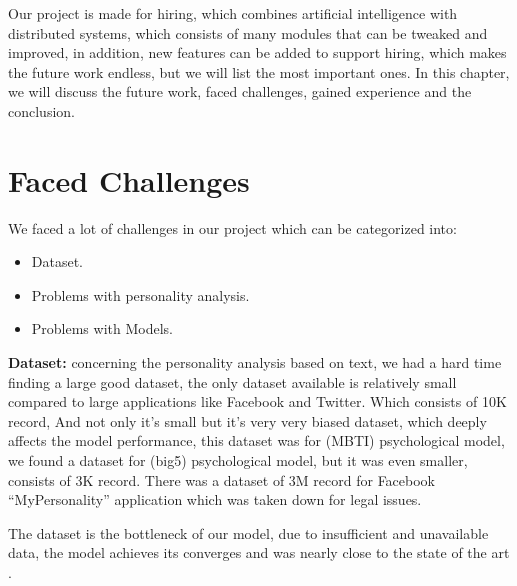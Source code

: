 

Our project is made for hiring, which combines artificial intelligence with distributed systems, which consists of many modules that can be tweaked and improved, in addition, new features can be added to support hiring, which makes the future work endless, but we will list the most important ones.\newline
In this chapter, we will discuss the future work, faced challenges,  gained experience and the conclusion.

\section{Faced Challenges}
We faced a lot of challenges in our project which can be categorized into: 
\begin{itemize}
    \item Dataset.
    \item Problems with personality analysis.
    \item Problems with Models.
\end{itemize}

\textbf{Dataset: }concerning the personality analysis based on text, we had a hard time finding a large good dataset, the only dataset available is relatively small compared to large applications like Facebook and Twitter.  Which consists of 10K record, And not only it’s small but it’s very very biased dataset, which deeply affects the model performance, this dataset was for (MBTI) psychological  model, we found a dataset for (big5) psychological  model, but it was even smaller, consists of 3K record. There was a dataset of 3M record for Facebook “MyPersonality” application which was taken down for legal issues.\cite{facebook_takedown_dataset} \newline
 
The dataset is the bottleneck of our model, due to insufficient and unavailable data, the model achieves its converges and was nearly close to the state of the art \cite{state_of_the_art_pers_text}.\newline 

